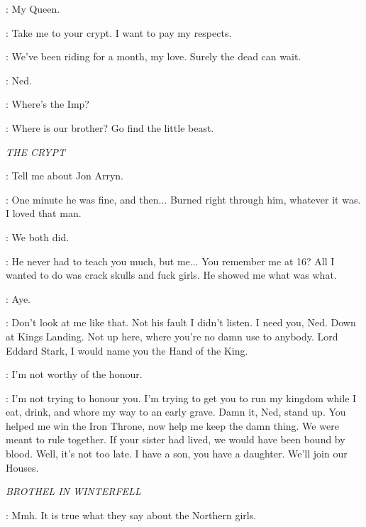\CATELYN: My Queen. 

\ROBERT: Take me to your crypt. I want to pay my respects. 

\CERSEI: We've been riding for a month, my love. Surely the dead can wait. 

\ROBERT: Ned. 


\ARYA: Where's the Imp? 


\CERSEI: Where is our brother? Go find the little beast. 


\scene

\textit{THE CRYPT} 


\NED: Tell me about Jon Arryn. 

\ROBERT: One minute he was fine, and then$\ldots$ Burned right through him, whatever it was. I loved that man. 

\NED: We both did. 

\ROBERT: He never had to teach you much, but me$\ldots$ You remember me at 16? All I wanted to do was crack skulls and fuck girls. He showed me what was what. 

\NED: Aye. 

\ROBERT: Don't look at me like that. Not his fault I didn't listen.  I need you, Ned. Down at Kings Landing. Not up here, where you're no damn use to anybody. Lord Eddard Stark, I would name you the Hand of the King. 


\NED: I'm not worthy of the honour. 

\ROBERT: I'm not trying to honour you. I'm trying to get you to run my kingdom while I eat, drink, and whore my way to an early grave. Damn it, Ned, stand up. You helped me win the Iron Throne, now help me keep the damn thing. We were meant to rule together. If your sister had lived, we would have been bound by blood. Well, it's not too late. I have a son, you have a daughter. We'll join our Houses. 


\scene

\textit{BROTHEL IN WINTERFELL} 


\TYRION: Mmh. It is true what they say about the Northern girls. 

